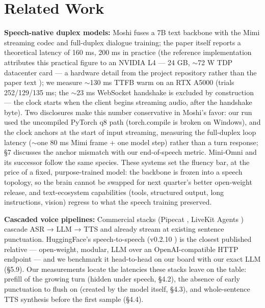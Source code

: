 \documentclass[journal]{IEEEtran}
\begin{document}
\section{Related Work}

\textbf{Speech-native duplex models:} Moshi \cite{defossez2024moshi} fuses a 7B text backbone with the Mimi streaming codec and full-duplex dialogue training; the paper itself reports a theoretical latency of 160 ms, 200 ms in practice \cite{defossez2024moshi} (the reference implementation attributes this practical figure to an NVIDIA L4 — 24 GB, $\sim$72 W TDP datacenter card — a hardware detail from the project repository rather than the paper text \cite{kyutai2024moshirepo,nvidial4}); we measure $\sim$130 ms TTFB warm on an RTX A5000 (trials 252/129/135 ms; the $\sim$23 ms WebSocket handshake is excluded by construction — the clock starts when the client begins streaming audio, after the handshake byte). Two disclosures make this number conservative in Moshi's favor: our run used the uncompiled PyTorch q8 path (torch.compile is broken on Windows), and the clock anchors at the start of input streaming, measuring the full-duplex loop latency ($\sim$one 80 ms Mimi frame + one model step) rather than a turn response; §7 discusses the anchor mismatch with our end-of-speech metric. Mini-Omni and its successor \cite{xie2024miniomni,xie2024miniomni2} follow the same species. These systems set the fluency bar, at the price of a fixed, purpose-trained model: the backbone is frozen into a speech topology, so the brain cannot be swapped for next quarter's better open-weight release, and text-ecosystem capabilities (tools, structured output, long instructions, vision) regress to what the speech training preserved.

\textbf{Cascaded voice pipelines:} Commercial stacks (Pipecat \cite{pipekit}, LiveKit Agents \cite{livekitagents}) cascade ASR → LLM → TTS and already stream at existing sentence punctuation. HuggingFace's speech-to-speech (v0.2.10 \cite{hfspeech2speech}) is the closest published relative — open-weight, modular, LLM over an OpenAI-compatible HTTP endpoint — and we benchmark it head-to-head on our board with our exact LLM (§5.9). Our measurements locate the latencies these stacks leave on the table: prefill of the growing turn (hidden under speech, §4.2), the absence of early punctuation to flush on (created by the model itself, §4.3), and whole-sentence TTS synthesis before the first sample (§4.4).
\end{document}
